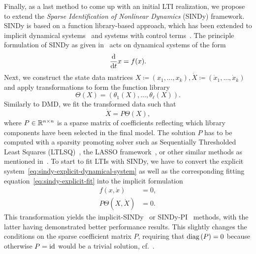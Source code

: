 Finally, as a last method to come up with an initial LTI realization, we propose to extend the \emph{Sparse Identification of Nonlinear Dynamics} (SINDy) framework.
SINDy is based on a function library-based approach, which has been extended to implicit dynamical systems~\cite{Mangan2016, Kaheman2020} and systems with control terms~\cite{Kaiser2018}.
The principle formulation of SINDy as given in~\cite{Brunton2016} acts on dynamical systems of the form
\begin{equation}\label{eq:sindy-explicit-dynamical-system}
    \frac{\mathop{}\!\mathrm{d}}{\mathop{}\!\mathrm{d} t} x = f(x).
\end{equation}
Next, we construct the state data matrices $X \coloneqq (x_1, \dots, x_k), \dot{X} \coloneqq (\dot{x}_1, \dots, \dot{x}_k)$ and apply transformations to form the function library
\begin{equation}\label{eq:sindy-explicit-library}
    \Theta(X) = (\theta_1(X), \dots, \theta_\ell(X)).
\end{equation}
Similarly to DMD, we fit the transformed data such that
\begin{equation}\label{eq:sindy-explicit-fit}
    \dot{X} = P \Theta(X),
\end{equation}
where $P \in \mathbb{R}^{n \times n}$ is a sparse matrix of coefficients reflecting which library components have been selected in the final model.
The solution $P$ has to be computed with a sparsity promoting solver such as Sequentially Thresholded Least Squares (LTLSQ)~\cite{Zhang2019}, the LASSO framework~\cite{Tibshirani1996}, or other similar methods as mentioned in~\cite{Kaiser2018, Kaheman2020}.
To start to fit LTIs with SINDy, we have to convert the explicit system~\eqref{eq:sindy-explicit-dynamical-system} as well as the corresponding fitting equation~\eqref{eq:sindy-explicit-fit} into the implicit formulation
\begin{equation}\label{eq:sindy-implicit-equations}
    \begin{aligned}
        f(x, \dot{x}) &= 0, \\
        P \Theta(X, \dot{X}) &= 0.
    \end{aligned}
\end{equation}
This transformation yields the implicit-SINDy~\cite{Mangan2016} or SINDy-PI~\cite{Kaheman2020} methods, with the latter having demonstrated better performance results.
This slightly changes the conditions on the sparse coefficient matrix $P$, requiring that $\mathop{}\!\mathrm{diag}\left(P\right) = 0$ because otherwise $P = \text{id}_{}$ would be a trivial solution, cf.~\cite[Section~3~(b)]{Kaheman2020}.
